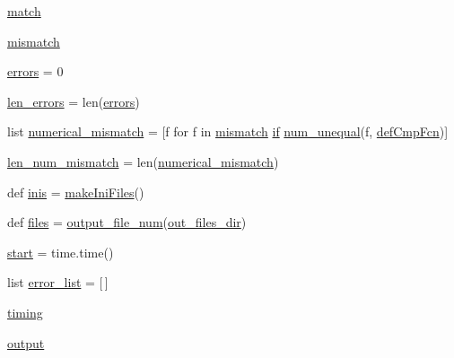 \begin{DoxyCompactItemize}
\item 
\mbox{\hyperlink{namespaceCAMB__test__files_af23f4e00bd78d804fe07da6c2353285c}{match}}
\item 
\mbox{\hyperlink{namespaceCAMB__test__files_aa80ce7293e95f2cb3e4e1ad2b0d424fa}{mismatch}}
\item 
\mbox{\hyperlink{namespaceCAMB__test__files_aed6dfae5d7772aeb01bdf0bc6ea2aff9}{errors}} = 0
\item 
\mbox{\hyperlink{namespaceCAMB__test__files_a31a287a53762589e5f0d1b752e547c4a}{len\+\_\+errors}} = len(\mbox{\hyperlink{namespaceCAMB__test__files_aed6dfae5d7772aeb01bdf0bc6ea2aff9}{errors}})
\item 
list \mbox{\hyperlink{namespaceCAMB__test__files_afe3806691a62f8356f9366cf3e506351}{numerical\+\_\+mismatch}} = \mbox{[}f for f in \mbox{\hyperlink{namespaceCAMB__test__files_aa80ce7293e95f2cb3e4e1ad2b0d424fa}{mismatch}} \mbox{\hyperlink{plotTT_8m_a722e57dd98d67aec0b3589ce8efff8bb}{if}} \mbox{\hyperlink{namespaceCAMB__test__files_a79f9b0e8484d9f397e2dc4addc178620}{num\+\_\+unequal}}(f, \mbox{\hyperlink{namespaceCAMB__test__files_aa74109e69e8ed8e8a518bb379902a1a0}{def\+Cmp\+Fcn}})\mbox{]}
\item 
\mbox{\hyperlink{namespaceCAMB__test__files_ac9ad1cb649c3984eee8d4f3cc182249c}{len\+\_\+num\+\_\+mismatch}} = len(\mbox{\hyperlink{namespaceCAMB__test__files_afe3806691a62f8356f9366cf3e506351}{numerical\+\_\+mismatch}})
\item 
def \mbox{\hyperlink{namespaceCAMB__test__files_adb63f5afc156ccfe8108790fdb1f5f49}{inis}} = \mbox{\hyperlink{namespaceCAMB__test__files_a2071b2434992a52dd7fc9c49db14d86d}{make\+Ini\+Files}}()
\item 
def \mbox{\hyperlink{namespaceCAMB__test__files_a830af4ed561145655ecc4f63423fd5b1}{files}} = \mbox{\hyperlink{namespaceCAMB__test__files_a2aa5d4f5677cf5a78388238c4dc45b7d}{output\+\_\+file\+\_\+num}}(\mbox{\hyperlink{namespaceCAMB__test__files_aab425eab53a3ec49aec1a01880b7bad7}{out\+\_\+files\+\_\+dir}})
\item 
\mbox{\hyperlink{namespaceCAMB__test__files_a0cace82a02e13f728b821892522caec6}{start}} = time.\+time()
\item 
list \mbox{\hyperlink{namespaceCAMB__test__files_aed3a631344121c3680babbd847dd4277}{error\+\_\+list}} = \mbox{[}$\,$\mbox{]}
\item 
\mbox{\hyperlink{namespaceCAMB__test__files_a22e6d582c6a2f15d29d552ba79bd8f8e}{timing}}
\item 
\mbox{\hyperlink{namespaceCAMB__test__files_a392636a8d8cbe4518d6774f916e88a64}{output}}

\end{DoxyCompactItemize}
